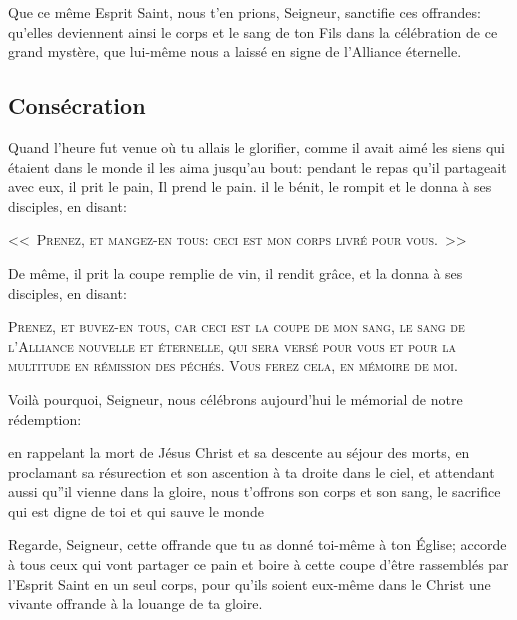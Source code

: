 
Que ce même Esprit Saint,
nous t'en prions, Seigneur,
sanctifie ces offrandes:
qu'elles deviennent ainsi 
le corps et le sang de ton Fils
dans la célébration de ce grand mystère,
que lui-même nous a laissé
en signe de l'Alliance éternelle.

\subsection*{Consécration}

Quand l'heure fut venue où tu allais le glorifier,
comme il avait aimé les siens qui étaient dans le monde
il les aima jusqu'au bout:
pendant le repas qu'il partageait avec eux,
il prit le pain, Il prend le pain.
il le bénit,
le rompit
et le donna à ses disciples, en disant:

\textsc{<<~Prenez, et mangez-en tous:} 
\textsc{ceci est mon corps
livré pour vous.~>>}



De même, il prit la coupe remplie de vin, 
il rendit grâce,
et la donna à ses disciples, en disant: 

\textsc{Prenez, et buvez-en tous,
car ceci est la coupe de mon sang,
le sang de l'Alliance nouvelle et éternelle,
qui sera versé
pour vous et pour la multitude
en rémission des péchés.
Vous ferez cela,
en mémoire de moi.}





Voilà pourquoi, Seigneur,
nous célébrons aujourd'hui
le mémorial de notre rédemption:

en rappelant la mort de Jésus Christ
et sa descente au séjour des morts,
en proclamant sa résurection
et son ascention à ta droite dans le ciel,
et attendant aussi
qu''il vienne dans la gloire,
nous t'offrons son corps et son sang,
le sacrifice qui est digne de toi
et qui sauve le monde

Regarde, Seigneur, cette offrande
que tu as donné toi-même à ton Église;
accorde à tous ceux qui vont partager ce pain
et boire à cette coupe
d'être rassemblés par l'Esprit Saint en un seul corps,
pour qu'ils soient eux-même dans le Christ
une vivante offrande
à la louange de ta gloire.

